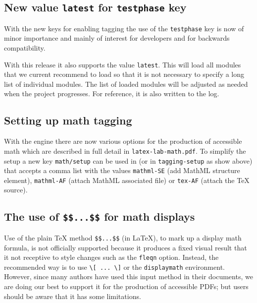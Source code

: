 \documentclass{ltnews}
\providecommand\env[1]{\texttt{#1}}
\providecommand\LuaTeX{\hologo{LuaTeX}}
\providecommand\env[1]{\texttt{#1}}
\begin{document}
\subsection{New value \texttt{latest} for \texttt{testphase} key}

With the new keys for enabling tagging the use of the
\texttt{testphase} key is now of minor importance and mainly of
interest for developers and for backwards compatibility.

With this release it also supports the value \texttt{latest}.  This
will load all modules that we current recommend to load so that it is not necessary to
specify a long list of individual modules. The list of loaded modules
will be adjusted as needed when the project progresses. For reference,
it is also written to the log.



\subsection{Setting up math tagging}

With the \LuaTeX{} engine there are now various options for the production of
accessible math 
which are described in full detail in \texttt{latex-lab-math.pdf}. To
simplify the setup 
a new key \texttt{math/setup} can be used in
 (or in \texttt{tagging-setup} as show above)
that accepts a comma list with the values
\texttt{mathml-SE} (add MathML structure element), \texttt{mathml-AF}
(attach MathML associated file) or \texttt{tex-AF} (attach the \TeX{}
source).


\subsection{The use of \texttt{\$\$...\$\$} for math displays}

Use of the plain \TeX{} method \verb=$$...$$= (in \LaTeX{}), to mark up a
display math formula, is not officially supported because it produces a
fixed visual result that it not receptive to style changes such as the
\texttt{fleqn} option. Instead, the recommended way is to use
\verb=\[ ... \]= or the \env{displaymath} environment. However, since many
authors %
have used this input method in their documents, we are doing our best to
support it for the production of accessible PDFs; but users should be
aware that it has some limitations.
\end{document}

